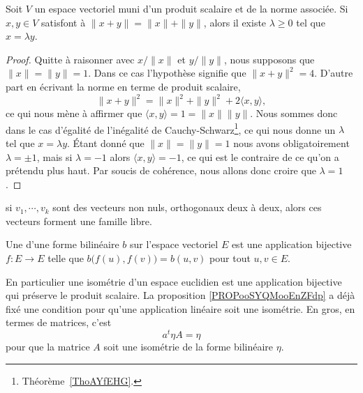 \begin{lemma}   \label{LemLPOHUme}
    Soit \( V\) un espace vectoriel muni d'un produit scalaire et de la norme associée. Si \( x,y\in V\) satisfont à \( \| x+y \|=\| x \|+\| y \|\), alors il existe \( \lambda\geq 0\) tel que \( x=\lambda y\).
\end{lemma}

\begin{proof}
    Quitte à raisonner avec \( x/\| x \|\) et \( y/\| y \|\), nous supposons que \( \| x \|=\| y \|=1\). Dans ce cas l'hypothèse signifie que \( \| x+y \|^2=4\). D'autre part en écrivant la norme en terme de produit scalaire,
    \begin{equation}
        \| x+y \|^2=\| x \|^2+\| y \|^2+2\langle x, y\rangle ,
    \end{equation}
    ce qui nous mène à affirmer que \( \langle x, y\rangle =1=\| x \|\| y \|\). Nous sommes donc dans le cas d'égalité de l'inégalité de Cauchy-Schwarz\footnote{Théorème~\ref{ThoAYfEHG}.}, ce qui nous donne un \( \lambda\) tel que \( x=\lambda y\). Étant donné que \( \| x \|=\| y \|=1\) nous avons obligatoirement \( \lambda=\pm 1\), mais si \( \lambda=-1\) alors \( \langle x, y\rangle =-1\), ce qui est le contraire de ce qu'on a prétendu plus haut. Par soucis de cohérence, nous allons donc croire que \( \lambda=1\).
\end{proof}

\begin{proposition}			\label{PropVectsOrthLibres}
	si $v_1,\cdots,v_k$ sont des vecteurs non nuls, orthogonaux deux à deux, alors ces vecteurs forment une famille libre.
\end{proposition}

\begin{definition}      \label{DEFooGGTYooXsHIZj}
    Une  d'une forme bilinéaire \( b\) sur l'espace vectoriel \( E\) est une application bijective \( f\colon E\to E\) telle que \( b\big( f(u),f(v) \big)=b(u,v)\) pour tout \( u,v\in E\).
\end{definition}
En particulier une isométrie d'un espace euclidien est une application bijective qui préserve le produit scalaire. La proposition \ref{PROPooSYQMooEnZFdp} a déjà fixé une condition pour qu'une application linéaire soit une isométrie. En gros, en termes de matrices, c'est 
\begin{equation}
a^t\eta A=\eta
\end{equation}
pour que la matrice \( A\) soit une isométrie de la forme bilinéaire \( \eta\).

